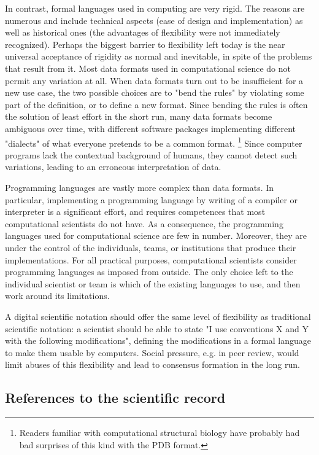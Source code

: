In contrast, formal languages used in computing are very rigid. The reasons are numerous and include technical aspects (ease of design and implementation) as well as historical ones (the advantages of flexibility were not immediately recognized). Perhaps the biggest barrier to flexibility left today is the near universal acceptance of rigidity as normal and inevitable, in spite of the problems that result from it. Most data formats used in computational science do not permit any variation at all. When data formats turn out to be insufficient for a new use case, the two possible choices are to "bend the rules" by violating some part of the definition, or to define a new format. Since bending the rules is often the solution of least effort in the short run, many data formats become ambiguous over time, with different software packages implementing different "dialects" of what everyone pretends to be a common format. \footnote{Readers familiar with computational structural biology have probably had bad surprises of this kind with the PDB \cite{wwpdb_atomic_2011} format.} Since computer programs lack the contextual background of humans, they cannot detect such variations, leading to an erroneous interpretation of data.

Programming languages are vastly more complex than data formats. In particular, implementing a programming language by writing of a compiler or interpreter is a significant effort, and requires competences that most computational scientists do not have. As a consequence, the programming languages used for computational science are few in number. Moreover, they are under the control of the individuals, teams, or institutions that produce their implementations. For all practical purposes, computational scientists consider programming languages as imposed from outside. The only choice left to the individual scientist or team is which of the existing languages to use, and then work around its limitations.

A digital scientific notation should offer the same level of flexibility as traditional scientific notation: a scientist should be able to state "I use conventions X and Y with the following modifications", defining the modifications in a formal language to make them usable by computers. Social pressure, e.g. in peer review, would limit abuses of this flexibility and lead to consensus formation in the long run.

\subsection{References to the scientific record}
\label{sr-references}

